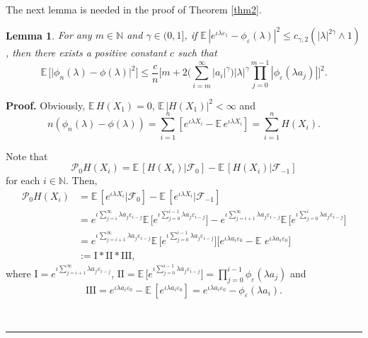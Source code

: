 \documentclass[11pt]{article}
\newtheorem{lemma}{Lemma}[section]
\newenvironment{proof}[1][Proof]{\textbf{#1.} }{\
\rule{0.5em}{0.5em}}
\def\E{{{\mathbb E}\,}}
\def\N{{\mathbb N}}
\begin{document}
The next lemma is needed in the proof of Theorem \ref{thm2}. 
\begin{lemma}  \label{lma2} 
For any $m\in\N$ and $\gamma \in (0,1]$, if $\E|e^{\iota \lambda \varepsilon_1}-\phi_{\varepsilon}(\lambda)|^{2}\leq c_{\gamma,2} \left(|\lambda|^{2\gamma}\wedge 1\right)$, then there exists a positive constant $c$ such that
\[
\E\Big[\big|\phi_{n}(\lambda)-\phi(\lambda)\big|^2\Big]\leq \frac{c}{n}\Big[ m+2\big(\sum_{i=m}^{\infty}|a_i|^{\gamma}\big)|\lambda|^{\gamma}\prod_{j=0}^{m-1}|\phi_{\varepsilon}(\lambda a_j)|\Big]^2.
\]
\end{lemma}
\begin{proof} 
Obviously, $\E H(X_1)=0$, $\E |H(X_1)|^2 <\infty$ and
\[
n(\phi_{n}(\lambda)-\phi(\lambda))=\sum\limits_{i=1}^{n}\left[e^{\iota \lambda  X_i}-\mathbb{E}\, e^{\iota \lambda  X_i}\right]=\sum\limits_{i=1}^{n} H(X_i).
\]

Note that
\[
\mathcal{P}_{0}H(X_i)=\E[H(X_i)|\mathcal{F}_0]-\E[H(X_i)|\mathcal{F}_{-1}]
\]
for each $i\in\N$. Then,
\begin{align*}
\mathcal{P}_{0}H(X_i)
&=\E[e^{\iota \lambda  X_i}|\mathcal{F}_0]-\E[e^{\iota \lambda  X_i}|
\mathcal{F}_{-1}]\nonumber \\
&=e^{\iota \sum\limits_{j=i}^{\infty} \lambda a_j \varepsilon_{i-j}}\E\Big[e^{\iota \sum\limits_{j=0}^{i-1} \lambda a_j \varepsilon_{i-j}}\Big]-e^{\iota \sum\limits_{j=i+1}^{\infty} \lambda a_j \varepsilon_{i-j}}\E\Big[e^{\iota \sum\limits_{j=0}^{i} \lambda a_j  \varepsilon_{i-j}}\Big]\\
&=e^{\iota \sum\limits_{j=i+1}^{\infty} \lambda a_j  \varepsilon_{i-j}}\E\Big[e^{\iota \sum\limits_{j=0}^{i-1} \lambda a_j \varepsilon_{i-j}}\Big]\Big[e^{\iota  \lambda a_i  \varepsilon_{0}}-\E\, e^{\iota  \lambda   a_i \varepsilon_{0}}\Big]\\
&:=\mbox{I} *\mbox{II}* \mbox{III},
\end{align*}
where $\mbox{I}=e^{\iota\sum\limits_{j=i+1}^{\infty}\lambda  a_j  \varepsilon_{i-j}}$, $\mbox{II}=\E\Big[e^{\iota\sum\limits_{j=0}^{i-1} \lambda a_j  \varepsilon_{i-j}}\Big]=\prod\limits_{j=0}^{i-1}\phi_{\varepsilon}(\lambda a_j)$ and 
\[
\mbox{III}=e^{\iota \lambda  a_i  \varepsilon_{0}}-\E[e^{\iota   \lambda a_i \varepsilon_{0}}]=e^{\iota   \lambda a_i \varepsilon_{0}}-\phi_{\varepsilon}(\lambda a_i).
\]


\end{proof}
\end{document}
